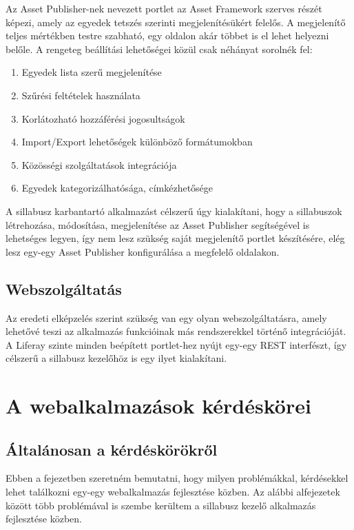 \documentclass[hidelinks, 12pt, a4paper]{report}
\begin{document}
Az Asset Publisher-nek nevezett portlet az Asset Framework szerves részét képezi, amely az egyedek tetszés szerinti megjelenítésükért felelős. A megjelenítő teljes mértékben testre szabható, egy oldalon akár többet is el lehet helyezni belőle. A rengeteg beállítási lehetőségei közül csak néhányat sorolnék fel:
\begin{enumerate}
\item Egyedek lista szerű megjelenítése
\item Szűrési feltételek használata
\item Korlátozható hozzáférési jogosultságok
\item Import/Export lehetőségek különböző formátumokban
\item Közösségi szolgáltatások integrációja
\item Egyedek kategorizálhatósága, címkézhetősége
\end{enumerate}

A sillabusz karbantartó alkalmazást célszerű úgy kialakítani, hogy a sillabuszok létrehozása, módosítása, megjelenítése az Asset Publisher segítségével is lehetséges legyen, így nem lesz szükség saját megjelenítő portlet készítésére, elég lesz egy-egy Asset Publisher konfigurálása a megfelelő oldalakon.

\section{Webszolgáltatás}

Az eredeti elképzelés szerint szükség van egy olyan webszolgáltatásra, amely lehetővé teszi az alkalmazás funkcióinak más rendszerekkel történő integrációját. A Liferay szinte minden beépített portlet-hez nyújt egy-egy REST interfészt, így célszerű a sillabusz kezelőhöz is egy ilyet kialakítani.

\chapter{A webalkalmazások kérdéskörei}

\section{Általánosan a kérdéskörökről}

Ebben a fejezetben szeretném bemutatni, hogy milyen problémákkal, kérdésekkel lehet találkozni egy-egy webalkalmazás fejlesztése közben. Az alábbi alfejezetek között több problémával is szembe kerültem a sillabusz kezelő alkalmazás fejlesztése közben.
\end{document}
